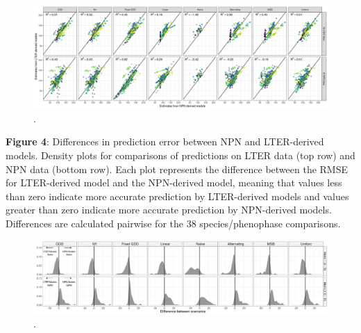 \documentclass[fleqn,12pt,lineno]{article}
\begin{document}
\newpage

\begin{figure}[H]
	\centering
		\includegraphics[scale=0.5, angle=90]{figure_estimate_compare.png}
	\caption{.}
\end{figure}


\newpage

\textbf{Figure 4}: Differences in prediction error between NPN and LTER-derived models. Density plots for comparisons of predictions on LTER data (top row) and NPN data (bottom row). Each plot represents the difference between the RMSE for LTER-derived model and the NPN-derived model, meaning that values less than zero indicate more accurate prediction by LTER-derived models and values greater than zero indicate more accurate prediction by NPN-derived models. Differences are calculated pairwise for the 38 species/phenophase comparisons.

\newpage

\begin{figure}[H]
	\centering
		\includegraphics[scale=0.4, angle=90]{figure_rmse_metrics_density_plot.png}
	\caption{.}
\end{figure}
\end{document}
